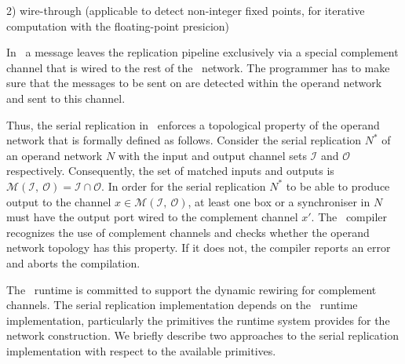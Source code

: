 2) wire-through (applicable to detect non-integer fixed points, for iterative computation with the floating-point presicion)


In \ak\, a message leaves the replication pipeline exclusively via a special complement channel that is wired to the rest of the \ak\ network. The programmer has to make sure that the messages to be sent on are detected within the operand network and sent to this channel. 

Thus, the serial replication in \ak\ enforces a topological property of the operand network that is formally defined as follows. Consider the serial replication $N^{*}$ of an operand network $N$ with the input and output channel sets $\mathcal{I}$ and $\mathcal{O}$ respectively. Consequently, the set of matched inputs and outputs is $\mathcal{M}(\mathcal{I}, \: \mathcal{O}) = \mathcal{I} \cap \mathcal{O}$. In order for the serial replication $N^{*}$ to be able to produce output to the channel $x \in \mathcal{M}(\mathcal{I}, \: \mathcal{O})$, at least one box or a synchroniser in $N$ must have the output port wired to the complement channel $x'$. The \ak\ compiler recognizes the use of complement channels and checks whether the operand network topology has this property. If it does not, the compiler reports an error and aborts the compilation.

The \ak\ runtime is committed to support the dynamic rewiring for complement channels. The serial replication implementation depends on the \ak\ runtime implementation, particularly the primitives the runtime system provides for the network construction. We briefly describe two approaches to the serial replication implementation with respect to the available primitives.



